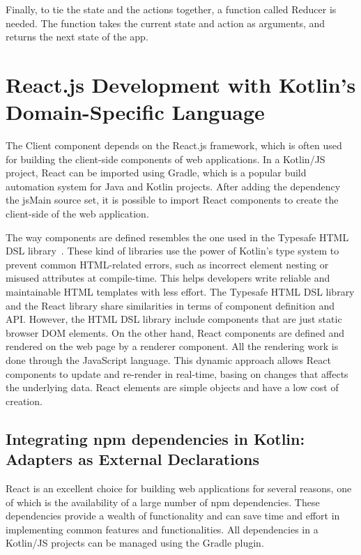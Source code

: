 Finally, to tie the state and the actions together, a function called Reducer is needed. The function takes the current state and action as arguments, and returns the next state of the app.

\section{React.js Development with Kotlin's Domain-Specific Language}
\label{sec:react-js-development-with-kotlin-s-domain-specific-language}

The Client component depends on the React.js framework, which is often used for building the client-side components of web applications. In a Kotlin/JS project, React can be imported using Gradle, which is a popular build automation system for Java and Kotlin projects. After adding the dependency the jsMain source set, it is possible to import React components to create the client-side of the web application.\newline

The way components are defined resembles the one used in the Typesafe HTML DSL library~\cite{Typesafe65:online}. These kind of libraries use the power of Kotlin's type system to prevent common HTML-related errors, such as incorrect element nesting or misused attributes at compile-time. This helps developers write reliable and maintainable HTML templates with less effort. The Typesafe HTML DSL library and the React library share similarities in terms of component definition and API. However, the HTML DSL library include components that are just static browser DOM elements. On the other hand, React components are defined and rendered on the web page by a renderer component. All the rendering work is done through the JavaScript language. This dynamic approach allows React components to update and re-render in real-time, basing on changes that affects the underlying data. React elements are simple objects and have a low cost of creation.\newline

\subsection{Integrating npm dependencies in Kotlin: Adapters as External Declarations}
\label{ssec:integrating-npm-dependencies-in-kotlin-adapters-as-external-declarations}

React is an excellent choice for building web applications for several reasons, one of which is the availability of a large number of npm dependencies. These dependencies provide a wealth of functionality and can save time and effort in implementing common features and functionalities. All dependencies in a Kotlin/JS projects can be managed using the Gradle plugin.\newline

